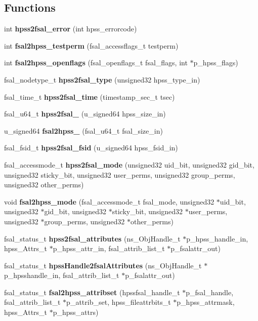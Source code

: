 \subsection*{Functions}
\begin{DoxyCompactItemize}
\item 
int {\bf hpss2fsal\_\-error} (int hpss\_\-errorcode)
\item 
int {\bf fsal2hpss\_\-testperm} (fsal\_\-accessflags\_\-t testperm)
\item 
int {\bf fsal2hpss\_\-openflags} (fsal\_\-openflags\_\-t fsal\_\-flags, int $\ast$p\_\-hpss\_\-flags)
\item 
fsal\_\-nodetype\_\-t {\bf hpss2fsal\_\-type} (unsigned32 hpss\_\-type\_\-in)
\item 
fsal\_\-time\_\-t {\bf hpss2fsal\_\-time} (timestamp\_\-sec\_\-t tsec)
\item 
fsal\_\-u64\_\-t {\bf hpss2fsal\_} (u\_\-signed64 hpss\_\-size\_\-in)
\item 
u\_\-signed64 {\bf fsal2hpss\_} (fsal\_\-u64\_\-t fsal\_\-size\_\-in)
\item 
fsal\_\-fsid\_\-t {\bf hpss2fsal\_\-fsid} (u\_\-signed64 hpss\_\-fsid\_\-in)
\item 
fsal\_\-accessmode\_\-t {\bf hpss2fsal\_\-mode} (unsigned32 uid\_\-bit, unsigned32 gid\_\-bit, unsigned32 sticky\_\-bit, unsigned32 user\_\-perms, unsigned32 group\_\-perms, unsigned32 other\_\-perms)
\item 
void {\bf fsal2hpss\_\-mode} (fsal\_\-accessmode\_\-t fsal\_\-mode, unsigned32 $\ast$uid\_\-bit, unsigned32 $\ast$gid\_\-bit, unsigned32 $\ast$sticky\_\-bit, unsigned32 $\ast$user\_\-perms, unsigned32 $\ast$group\_\-perms, unsigned32 $\ast$other\_\-perms)
\item 
fsal\_\-status\_\-t {\bf hpss2fsal\_\-attributes} (ns\_\-ObjHandle\_\-t $\ast$p\_\-hpss\_\-handle\_\-in, hpss\_\-Attrs\_\-t $\ast$p\_\-hpss\_\-attr\_\-in, fsal\_\-attrib\_\-list\_\-t $\ast$p\_\-fsalattr\_\-out)
\item 
fsal\_\-status\_\-t {\bf hpssHandle2fsalAttributes} (ns\_\-ObjHandle\_\-t $\ast$p\_\-hpsshandle\_\-in, fsal\_\-attrib\_\-list\_\-t $\ast$p\_\-fsalattr\_\-out)
\item 
fsal\_\-status\_\-t {\bf fsal2hpss\_\-attribset} (hpssfsal\_\-handle\_\-t $\ast$p\_\-fsal\_\-handle, fsal\_\-attrib\_\-list\_\-t $\ast$p\_\-attrib\_\-set, hpss\_\-fileattrbits\_\-t $\ast$p\_\-hpss\_\-attrmask, hpss\_\-Attrs\_\-t $\ast$p\_\-hpss\_\-attrs)
\end{DoxyCompactItemize}


